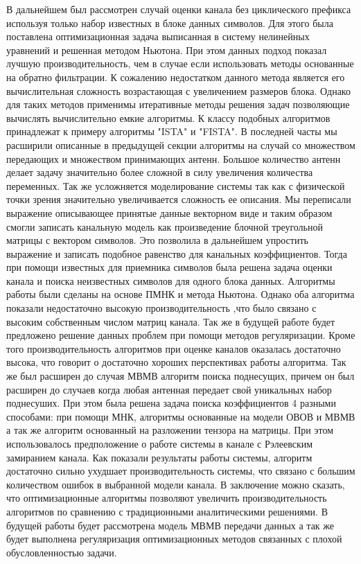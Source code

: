 В дальнейшем был рассмотрен случай оценки канала без циклического префикса используя только набор известных в блоке данных символов. Для этого была поставлена оптимизационная задача выписанная в систему нелинейных уравнений и решенная методом Ньютона. При этом данных подход показал лучшую производительность, чем в случае если использовать методы основанные на обратно фильтрации. К сожалению недостатком данного метода является его вычислительная сложность возрастающая с увеличением размеров блока. Однако для таких методов применимы итеративные методы решения задач позволяющие вычислять вычислительно емкие алгоритмы. К классу подобных алгоритмов принадлежат к примеру алгоритмы "ISTA" и "FISTA".
В последней часты мы расширили описанные в предыдущей секции алгоритмы на случай со множеством передающих и множеством принимающих антенн. Большое количество антенн делает задачу значительно более сложной в силу увеличения количества переменных. Так же усложняется моделирование системы так как с физической точки зрения значительно увеличивается сложность ее описания. Мы переписали выражение описывающее принятые данные векторном виде и таким образом смогли записать канальную модель как произведение блочной треугольной матрицы с вектором символов. Это позволила в дальнейшем упростить выражение и записать подобное равенство для канальных коэффициентов. Тогда при помощи известных для приемника символов была решена задача оценки канала и поиска неизвестных символов для одного блока данных. Алгоритмы работы были сделаны на основе ПМНК и метода Ньютона. Однако оба алгоритма показали недостаточно высокую производительность ,что было связано с высоким собственным числом матриц канала. Так же в будущей работе будет предложено решение данных проблем при помощи методов регуляризации. Кроме того производительность алгоритмов при оценке каналов оказалась достаточно высока, что  говорит о достаточно хороших перспективах работы алгоритма. Так же был расширен до случая МВМВ алгоритм поиска поднесущих, причем он был расширен до случаев когда любая антенная передает свой уникальных набор поднесуших. При этом была решена задача поиска коэффициентов 4 разными  способами: при помощи МНК, алгоритмы основанные на модели ОВОВ и МВМВ а так же алгоритм основанный на разложении тензора на матрицы. При этом использовалось предположение о работе системы в канале с Рэлеевским замиранием канала. Как показали результаты работы системы, алгоритм достаточно сильно ухудшает производительность системы, что связано с большим количеством ошибок в выбранной модели канала. 
В заключение можно сказать, что оптимизационные алгоритмы позволяют увеличить производительность алгоритмов по сравнению с традиционными аналитическими решениями. В будущей работы будет рассмотрена модель МВМВ передачи данных а так же будет выполнена регуляризация оптимизационных методов связанных с плохой обусловленностью задачи.

